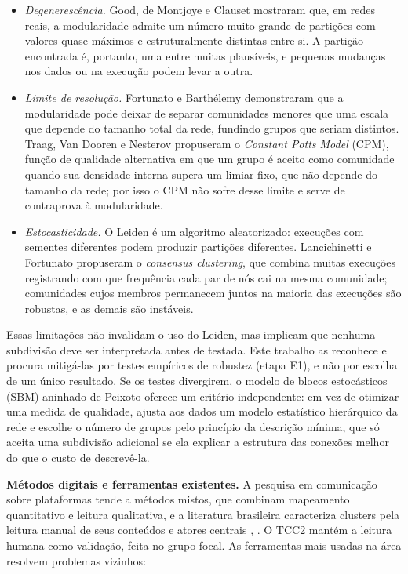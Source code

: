 \documentclass[12pt,a4paper,oneside]{article}
\begin{document}
\begin{itemize}
\item \emph{Degenerescência.} Good, de Montjoye e Clauset \cite{good2010} mostraram que, em redes reais, a modularidade admite um número muito grande de partições com valores quase máximos e estruturalmente distintas entre si. A partição encontrada é, portanto, uma entre muitas plausíveis, e pequenas mudanças nos dados ou na execução podem levar a outra.
\item \emph{Limite de resolução.} Fortunato e Barthélemy \cite{fortunato2007} demonstraram que a modularidade pode deixar de separar comunidades menores que uma escala que depende do tamanho total da rede, fundindo grupos que seriam distintos. Traag, Van Dooren e Nesterov \cite{traag2011} propuseram o \emph{Constant Potts Model} (CPM), função de qualidade alternativa em que um grupo é aceito como comunidade quando sua densidade interna supera um limiar fixo, que não depende do tamanho da rede; por isso o CPM não sofre desse limite e serve de contraprova à modularidade.
\item \emph{Estocasticidade.} O Leiden é um algoritmo aleatorizado: execuções com sementes diferentes podem produzir partições diferentes. Lancichinetti e Fortunato \cite{lancichinetti2012} propuseram o \emph{consensus clustering}, que combina muitas execuções registrando com que frequência cada par de nós cai na mesma comunidade; comunidades cujos membros permanecem juntos na maioria das execuções são robustas, e as demais são instáveis.
\end{itemize}

Essas limitações não invalidam o uso do Leiden, mas implicam que nenhuma subdivisão deve ser interpretada antes de testada. Este trabalho as reconhece e procura mitigá-las por testes empíricos de robustez (etapa E1), e não por escolha de um único resultado. Se os testes divergirem, o modelo de blocos estocásticos (SBM) aninhado de Peixoto \cite{peixoto2014} oferece um critério independente: em vez de otimizar uma medida de qualidade, ajusta aos dados um modelo estatístico hierárquico da rede e escolhe o número de grupos pelo princípio da descrição mínima, que só aceita uma subdivisão adicional se ela explicar a estrutura das conexões melhor do que o custo de descrevê-la.

\textbf{Métodos digitais e ferramentas existentes.} A pesquisa em comunicação sobre plataformas tende a métodos mistos, que combinam mapeamento quantitativo e leitura qualitativa, e a literatura brasileira caracteriza clusters pela leitura manual de seus conteúdos e atores centrais \cite{recuero2021}, \cite{hoffmann2025}. O TCC2 mantém a leitura humana como validação, feita no grupo focal. As ferramentas mais usadas na área resolvem problemas vizinhos:
\end{document}
